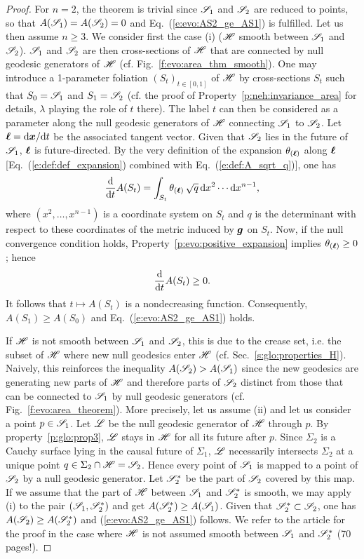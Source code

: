 \begin{proof}
For $n=2$, the theorem is trivial since $\mathscr{S}_1$ and $\mathscr{S}_2$ are reduced to
points, so that $A(\mathscr{S}_1) = A(\mathscr{S}_2) = 0$ and Eq.~(\ref{e:evo:AS2_ge_AS1}) is fulfilled.
Let us then assume $n\geq 3$.
We consider first the case (i) ($\mathscr{H}$ smooth between
$\mathscr{S}_1$ and $\mathscr{S}_2$).
$\mathscr{S}_1$ and $\mathscr{S}_2$ are then cross-sections of $\mathscr{H}$
that are connected by null geodesic generators of $\mathscr{H}$
(cf. Fig.~\ref{f:evo:area_thm_smooth}).
One may introduce a 1-parameter foliation $(S_t)_{t\in [0,1]}$ of $\mathscr{H}$ by
cross-sections $S_t$ such that $S_0 = \mathscr{S}_1$ and $S_1 = \mathscr{S}_2$
(cf. the proof of Property~\ref{p:neh:invariance_area} for details, $\lambda$
playing the role of $t$ there). The label $t$
can then be considered as a parameter along the null geodesic generators of $\mathscr{H}$
connecting $\mathscr{S}_1$ to $\mathscr{S}_2$.
Let $\bm{\ell} = \mathrm{d}\bm{x}/\mathrm{d} t$ be the associated tangent vector.
Given that $\mathscr{S}_2$ lies in the future of $\mathscr{S}_1$, $\bm{\ell}$ is future-directed.
By the very definition
of the expansion $\theta_{(\bm{\ell})}$ along $\bm{\ell}$ [Eq.~(\ref{e:def:def_expansion})
combined with Eq.~(\ref{e:def:A_sqrt_q})], one has
\[
    \frac{\mathrm{d} }{\mathrm{d} t} A(S_t) = \int_{S_t} \theta_{(\bm{\ell})} \,  \sqrt{q} \, \mathrm{d} x^2 \cdots \mathrm{d} x^{n-1} ,
\]
where $(x^2, \ldots, x^{n-1})$ is a coordinate system on $S_t$ and $q$ is
the determinant with respect to these coordinates of the metric
induced by $\bm{g}$ on $S_t$.
Now, if the null convergence condition holds, Property~\ref{p:evo:positive_expansion} implies
$\theta_{(\bm{\ell})} \geq 0$; hence
\[
  \frac{\mathrm{d} }{\mathrm{d} t} A(S_t) \geq 0 .
\]
It follows that $t\mapsto A(S_t)$ is a nondecreasing function. Consequently, $A(S_1) \geq A(S_0)$
and Eq.~(\ref{e:evo:AS2_ge_AS1}) holds.

If $\mathscr{H}$ is not smooth between $\mathscr{S}_1$ and $\mathscr{S}_2$, this is due to the crease set,
i.e. the subset of $\mathscr{H}$ where new null geodesics enter $\mathscr{H}$ (cf. Sec.~\ref{s:glo:properties_H}).
Naively, this reinforces the inequality $A(\mathscr{S}_2) > A(\mathscr{S}_1)$ since the new geodesics
are generating new parts of $\mathscr{H}$ and therefore parts of $\mathscr{S}_2$ distinct
from those that can be connected to $\mathscr{S}_1$ by null geodesic generators
(cf. Fig.~\ref{f:evo:area_theorem}). More precisely, let us assume (ii) and
let us consider a point $p\in\mathscr{S}_1$. Let $\mathscr{L}$ be the null geodesic
generator of $\mathscr{H}$ through $p$. By property~\ref{p:glo:prop3}, $\mathscr{L}$ stays in $\mathscr{H}$ for all its future after $p$. Since $\Sigma_2$ is a Cauchy surface lying in the causal future of $\Sigma_1$, $\mathscr{L}$
necessarily intersects $\Sigma_2$ at a unique point $q \in \Sigma_2\cap\mathscr{H} = \mathscr{S}_2$.
Hence every point of $\mathscr{S}_1$ is mapped to a point of $\mathscr{S}_2$ by a null geodesic generator.
Let $\mathscr{S}_2^*$ be the part of $\mathscr{S}_2$ covered by this map.
If we assume that the part of $\mathscr{H}$ between $\mathscr{S}_1$ and $\mathscr{S}_2^*$ is smooth,
we may apply (i) to the pair $(\mathscr{S}_1, \mathscr{S}_2^*)$
and get $A(\mathscr{S}_2^*) \geq A(\mathscr{S}_1)$. Given that $\mathscr{S}_2^* \subset \mathscr{S}_2$, one has
$A(\mathscr{S}_2) \geq A(\mathscr{S}_2^*)$ and (\ref{e:evo:AS2_ge_AS1}) follows.
We refer to the article \cite{ChrusDGH01} for the proof in the case where
$\mathscr{H}$ is not assumed smooth between $\mathscr{S}_1$ and $\mathscr{S}_2^*$ (70 pages!).
\end{proof}

